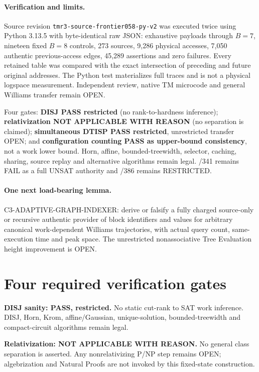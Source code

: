 \documentclass[11pt]{article}
\begin{document}
\paragraph{Verification and limits.}
Source revision \texttt{tmr3-source-frontier058-py-v2}
was executed twice using Python 3.13.5 with byte-identical
raw JSON: exhaustive payloads through $B=7$, nineteen fixed
$B=8$ controls, 273 sources, 9,286 physical accesses, 7,050
authentic previous-access edges, 45,289 assertions and
zero failures. Every retained table was compared with the
exact intersection of preceding and future original addresses.
The Python test materializes full traces and is not a
physical logspace measurement. Independent review, native TM
microcode and general Williams transfer remain OPEN.

Four gates: \textbf{DISJ PASS restricted} (no rank-to-hardness
inference); \textbf{relativization NOT APPLICABLE WITH REASON}
(no separation is claimed); \textbf{simultaneous DTISP PASS
restricted}, unrestricted transfer OPEN; and
\textbf{configuration counting PASS as upper-bound consistency},
not a work lower bound. Horn, affine, bounded-treewidth,
selector, caching, sharing, source replay and alternative
algorithms remain legal. /341 remains FAIL as a full UNSAT
authority and /386 remains RESTRICTED.

\paragraph{One next load-bearing lemma.}
\textsf{C3-ADAPTIVE-GRAPH-INDEXER}: derive or falsify a
fully charged source-only or recursive authentic provider of
block identifiers and values for arbitrary canonical
work-dependent Williams trajectories, with actual query count,
same-execution time and peak space. The unrestricted
nonassociative Tree Evaluation height improvement is OPEN.

\section{Four required verification gates}
\noindent\textbf{DISJ sanity: PASS, restricted.} No static 
cut-rank to SAT work inference. DISJ, Horn, Krom, 
affine/Gaussian, unique-solution, bounded-treewidth and 
compact-circuit algorithms remain legal.

\noindent\textbf{Relativization: NOT APPLICABLE WITH REASON.} 
No general class separation is asserted. Any nonrelativizing 
P/NP step remains OPEN; algebrization and Natural Proofs 
are not invoked by this fixed-state construction.
\end{document}
